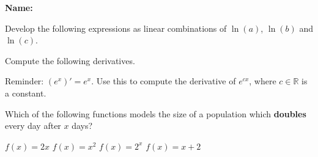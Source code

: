 \documentclass[9pt]{exam}
\begin{document}
\textbf{Name:} \dotfill

\begin{questions}

\question[5] Develop the following expressions as linear combinations of $\ln(a)$, $\ln(b)$ and $\ln(c)$.

\question[5] Compute the following derivatives.


\question[2] Reminder: $(e^x)' = e^x$. Use this to compute the derivative of $e^{cx}$, where $c \in \mathbb{R}$ is a constant.
\fillwithdottedlines{21mm}


\question[4] Which of the following functions models the size of a population which \textbf{doubles} every day after $x$ days?

\begin{oneparchoices}
\choice $f(x) = 2x$
\choice $f(x) = x^2$
\choice $f(x) = 2^x$
\choice $f(x) = x + 2$
\end{oneparchoices}


\end{questions}
\end{document}

